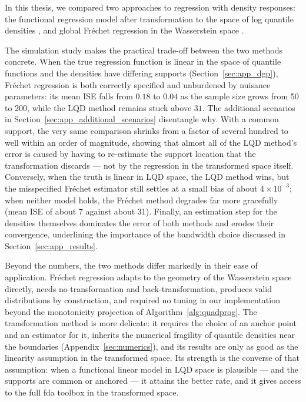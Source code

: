In this thesis, we compared two approaches to regression with density responses: the
functional regression model after transformation to the space of log quantile
densities \parencites{PetersenMüller2016}{KokoszkaEtAl2019}, and global Fréchet
regression in the Wasserstein space \parencite{PetersenMüller2019}.

The simulation study makes the practical trade-off between the two methods concrete.
When the true regression function is linear in the space of quantile functions and
the densities have differing supports (Section~\ref{sec:app_dgp}), Fréchet
regression is both correctly specified and unburdened by nuisance parameters: its
mean ISE falls from $0.18$ to $0.04$ as the sample size grows from 50 to 200, while
the LQD method remains stuck above $31$. The additional scenarios in
Section~\ref{sec:app_additional_scenarios} disentangle why. With a common support,
the very same comparison shrinks from a factor of several hundred to well within an
order of magnitude, showing that almost all of the LQD method's error is caused by
having to re-estimate the support location that the transformation discards --- not
by the regression in the transformed space itself. Conversely, when the truth is
linear in LQD space, the LQD method wins, but the misspecified Fréchet estimator
still settles at a small bias of about $4 \times 10^{-3}$; when neither model holds,
the Fréchet method degrades far more gracefully (mean ISE of about 7 against about
31). Finally, an estimation step for the densities themselves dominates the error of
both methods and erodes their convergence, underlining the importance of the
bandwidth choice discussed in Section~\ref{sec:app_results}.

Beyond the numbers, the two methods differ markedly in their ease of application.
Fréchet regression adapts to the geometry of the Wasserstein space directly, needs
no transformation and back-transformation, produces valid distributions by
construction, and required no tuning in our implementation beyond the monotonicity
projection of Algorithm~\ref{alg:quadprog}. The transformation method is more
delicate: it requires the choice of an anchor point and an estimator for it,
inherits the numerical fragility of quantile densities near the boundaries
(Appendix~\ref{sec:numerics}), and its results are only as good as the linearity
assumption in the transformed space. Its strength is the converse of that
assumption: when a functional linear model in LQD space is plausible --- and the
supports are common or anchored --- it attains the better rate, and it gives access
to the full fda toolbox in the transformed space.

